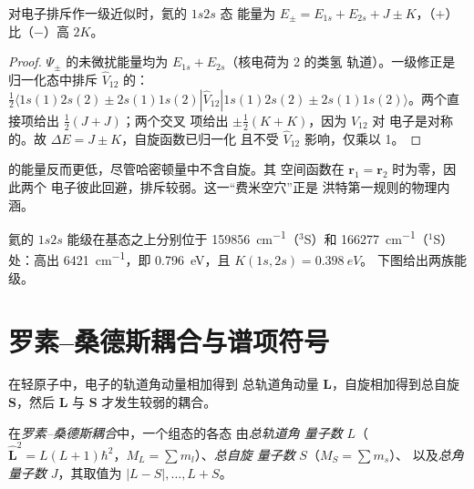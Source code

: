 \begin{proposition}[单重态与三重态的能量]\label{prop:b3:many-electron-atoms:helium}
对电子排斥作一级近似时，氦的 $1s2s$ 态
能量为 $E_\pm = E_{1s} + E_{2s} + J \pm K$，（$+$）
比（$-$）高 $2K$。
\end{proposition}

\begin{proof}
$\Psi_\pm$ 的未微扰能量均为 $E_{1s} + E_{2s}$（核电荷为 2 的类氢
轨道）。一级修正是
归一化态中排斥 $\hat V_{12}$ 的：
$\frac12\langle 1s(1)2s(2) \pm 2s(1)1s(2)|\hat V_{12}|1s(1)2s(2) \pm
2s(1)1s(2)\rangle$。两个直接项给出 $\frac12(J + J)$；两个交叉
项给出 $\pm\frac12(K + K)$，因为 $\hat V_{12}$ 对
电子是对称的。故 $\Delta E = J \pm K$，自旋函数已归一化
且不受 $\hat V_{12}$ 影响，仅乘以 1。
\end{proof}

的能量反而更低，尽管哈密顿量中不含自旋。其
空间函数在 $\mathbf r_1 = \mathbf r_2$ 时为零，因此两个
电子彼此回避，排斥较弱。这一“费米空穴”正是
洪特第一规则的物理内涵。

\begin{example}\label{ex:b3:many-electron-atoms:K}
氦的 $1s2s$ 能级在基态之上分别位于 \qty{159856}{cm^{-1}}（${}^3$S）和
\qty{166277}{cm^{-1}}（${}^1$S）处：高出
\qty{6421}{cm^{-1}}，即 \qty{0.796}{eV}，且 $K(1s,2s) = \qty{0.398}{eV}$。
下图给出两族能级。
\end{example}

\section{罗素–桑德斯耦合与谱项符号}

在轻原子中，电子的轨道角动量相加得到
总轨道角动量 $\mathbf L$，自旋相加得到总自旋 $\mathbf S$，然后
$\mathbf L$ 与 $\mathbf S$ 才发生较弱的耦合。

\begin{definition}[罗素–桑德斯耦合]\label{def:b3:many-electron-atoms:russell-saunders}
在\emph{罗素–桑德斯耦合}中，一个组态的各态
由\emph{总轨道角
量子数}
$L$（$\hat{\mathbf L}^2 = L(L+1)\hbar^2$，$M_L = \sum m_l$）、\emph{总自旋
量子数} $S$（$M_S = \sum m_s$）、
以及\emph{总角量子数}
$J$，其取值为 $|L - S|, \dots, L + S$。
\end{definition}

